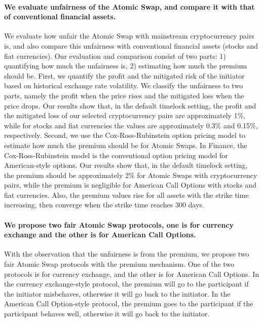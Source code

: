 \paragraph{We evaluate unfairness of the Atomic Swap, and compare it with that of conventional financial assets.}
We evaluate how unfair the Atomic Swap with mainstream cryptocurrency pairs is, and also compare this unfairness with conventional financial assets (stocks and fiat currencies).
Our evaluation and comparison consist of two parts: 1) quantifying how much the unfairness is, 2) estimating how much the premium should be.
First, we quantify the profit and the mitigated risk of the initiator based on historical exchange rate volatility.
We classify the unfairness to two parts, namely the profit when the price rises and the mitigated loss when the price drops.
Our results show that, in the default timelock setting, the profit and the mitigated loss of our selected cryptocurrency pairs are approximately 1\%, while for stocks and fiat currencies the values are approximately 0.3\% and 0.15\%, respectively.
Second, we use the Cox-Ross-Rubinstein option pricing model to estimate how much the premium should be for Atomic Swaps.
In Finance, the Cox-Ross-Rubinstein model is the conventional option pricing model for American-style options.
Our results show that, in the default timelock setting, the premium should be approximately 2\% for Atomic Swaps with cryptocurrency pairs, while the premium is negligible for American Call Options with stocks and fiat currencies.
Also, the premium values rise for all assets with the strike time increasing, then converge when the strike time reaches 300 days.

\paragraph{We propose two fair Atomic Swap protocols, one is for currency exchange and the other is for American Call Options.}
With the observation that the unfairness is from the premium,
we propose two fair Atomic Swap protocols with the premium mechanism.
One of the two protocols is for currency exchange, and the other is for American Call Options.
In the currency exchange-style protocol, the premium will go to the participant if the initiator misbehaves, otherwise it will go back to the initiator.
In the American Call Option-style protocol, the premium goes to the participant if the participant behaves well, otherwise it will go back to the initiator.


